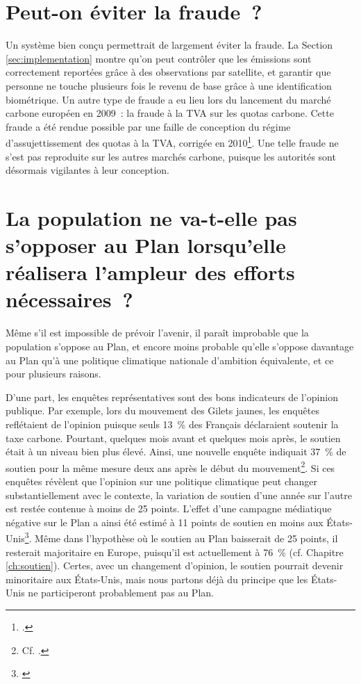 \documentclass[a5paper,french]{memoir}
\begin{document}
\section*{\normalsize Peut-on éviter la fraude~?}\label{q:fraude}

Un système bien conçu permettrait de largement éviter la fraude. La Section \ref{sec:implementation} montre qu'on peut contrôler que les émissions sont correctement reportées grâce à des observations par satellite, et garantir que personne ne touche plusieurs fois le revenu de base grâce à une identification biométrique. Un autre type de fraude a eu lieu lors du lancement du marché carbone européen en 2009~: la fraude à la TVA sur les quotas carbone. Cette fraude a été rendue possible par une faille de conception du régime d'assujettissement des quotas à la TVA, corrigée en 2010\footnote{\cite{cour_des_comptes_fraude_2012}.}. Une telle fraude ne s'est pas reproduite sur les autres marchés carbone, puisque les autorités sont désormais vigilantes à leur conception.


\section*{\normalsize La population ne va-t-elle pas s'opposer au Plan lorsqu'elle réalisera l'ampleur des efforts nécessaires~?}\label{q:soutien}

Même s'il est impossible de prévoir l'avenir, il paraît improbable que la population s'oppose au Plan, et encore moins probable %
qu'elle s'oppose davantage au Plan qu'à une politique climatique nationale d'ambition équivalente, et ce pour plusieurs raisons. 

D'une part, les enquêtes représentatives sont des bons indicateurs de l'opinion publique. Par exemple, lors du mouvement des Gilets jaunes, les enquêtes reflétaient de l'opinion puisque seuls 13~\% des Français déclaraient soutenir la taxe carbone. Pourtant, quelques mois avant et quelques mois après, le soutien était à un niveau bien plus élevé. Ainsi, une nouvelle enquête indiquait 37~\% de soutien pour la même mesure deux ans après le début du mouvement\footnote{Cf. \cite{douenne_les_2020}.}. Si ces enquêtes révèlent que l'opinion sur une politique climatique peut changer substantiellement avec le contexte, la variation de soutien d'une année sur l'autre est restée contenue à moins de 25 points. L'effet d'une campagne médiatique négative sur le Plan a ainsi été estimé à 11 points de soutien en moins 
aux États-Unis\footnote{\cite{fabre_international_2023}}. Même dans l'hypothèse où le soutien au Plan baisserait de 25 points, il resterait majoritaire en Europe, puisqu'il est actuellement à 76~\% (cf. Chapitre \ref{ch:soutien}). Certes, avec un changement d'opinion, le soutien pourrait devenir minoritaire aux États-Unis, mais nous partons déjà du principe que les États-Unis ne participeront probablement pas au Plan. 
\end{document}
